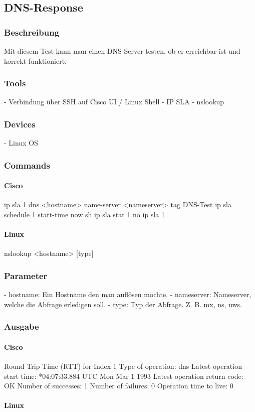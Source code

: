 \documentclass[a4,12pt]{scrartcl}
\begin{document}
\subsection{DNS-Response}
\subsubsection{Beschreibung}
Mit diesem Test kann man einen DNS-Server testen, ob er erreichbar ist und korrekt funktioniert.
\subsubsection{Tools}
- Verbindung über SSH auf Cisco UI / Linux Shell
- IP SLA
- nslookup
\subsubsection{Devices}
- Linux OS
\subsubsection{Commands}
\paragraph{Cisco}
ip sla 1
dns <hostname> name-server <nameserver>
tag DNS-Test
ip sla schedule 1 start-time now
sh ip sla stat 1
no ip sla 1
			
\paragraph{Linux}
nslookup <hostname> [type]
\subsubsection{Parameter}
- hostname: Ein Hostname den man auflösen möchte.
- nameserver: Nameserver, welche die Abfrage erledigen soll.
- type: Typ der Abfrage. Z. B. mx, ns, uws.
\subsubsection{Ausgabe}
\paragraph{Cisco}
Round Trip Time (RTT) for       Index 1
Type of operation: dns
Latest operation start time: *04:07:33.884 UTC Mon Mar 1 1993
Latest operation return code: OK
Number of successes: 1
Number of failures: 0
Operation time to live: 0
\paragraph{Linux}
\end{document}
